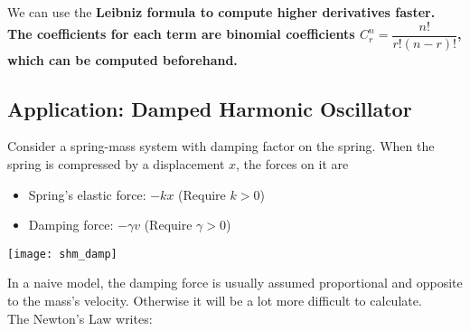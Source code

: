 \documentclass[class=article, crop=false, 12pt]{standalone}
\begin{document}
\begin{notation}
    We can use the \bf{Leibniz formula} to compute higher derivatives faster.
    The coefficients for each term are binomial coefficients $C_r^n = \dfrac{n!}{r!(n-r)!}$, which can be computed beforehand.
\end{notation}


\subsection{Application: Damped Harmonic Oscillator}

Consider a spring-mass system with damping factor on the spring.
When the spring is compressed by a displacement $x$, the forces on it are

\begin{minipage}{0.7\textwidth}
    \begin{itemize}
        \item Spring's elastic force: $-kx$ (Require $k>0$)
        \item Damping force: $-\gamma v$ (Require $\gamma >0$)
    \end{itemize}
\end{minipage}
\begin{minipage}{0.28\textwidth}
    \texttt{[image: shm\_damp]}
\end{minipage}


In a naive model, the damping force is usually assumed proportional and opposite to the mass's velocity.
Otherwise it will be a lot more difficult to calculate.\\

The Newton's  Law writes:
\end{document}
